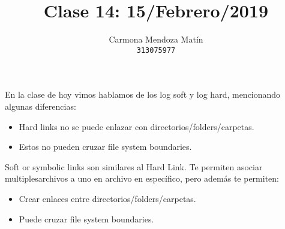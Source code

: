 \documentclass[11pt, a4paper]{report}
\begin{document}
\title{Clase 14: 15/Febrero/2019}
\author{
  Carmona Mendoza Mat\'in\\
  \texttt{313075977}
}
\date{}
\maketitle

En la clase de hoy vimos hablamos de los log soft y log hard, mencionando
algunas diferencias:

\begin{itemize}
\item Hard links no se puede enlazar con directorios/folders/carpetas.
\item Estos no pueden cruzar file system boundaries.
\end{itemize}

Soft or symbolic links son similares al Hard Link. Te permiten
asociar multiplesarchivos a uno en archivo en específico, pero además
te permiten:

\begin{itemize}
\item Crear enlaces entre directorios/folders/carpetas.
\item Puede cruzar file system boundaries.
\end{itemize}
\end{document}
